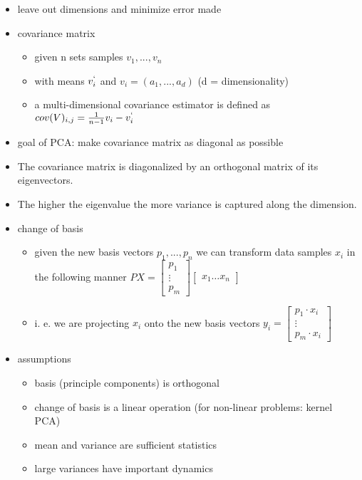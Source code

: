 \documentclass[paper=a4, fontsize=11pt]{scrartcl} %
\numberwithin{equation}{section} %
\numberwithin{figure}{section} %
\numberwithin{table}{section} %
\begin{document}
\begin{itemize}
\item leave out dimensions and minimize error made
\item covariance matrix
\begin{itemize}
\item given n sets samples $v_1,...,v_n$
\item with means $v_i^{`}$ and $v_i = (a_1,...,a_d)$ (d = dimensionality)
\item a multi-dimensional covariance estimator is defined as $cov(V)_{i,j} = \frac{1}{n-1}{v_i - v_i^{`}}$
\end{itemize}
\item goal of PCA: make covariance matrix as diagonal as possible
\item The covariance matrix is diagonalized by an orthogonal matrix of its eigenvectors.
\item The higher the eigenvalue the more variance is captured along the dimension.
\item change of basis
\begin{itemize}
\item given the new basis vectors $p_1,...,p_n$ we can transform data samples $x_i$ in the following manner $PX = \begin{bmatrix}
           p_{1} \\
           \vdots \\
           p_{m}
         \end{bmatrix} \begin{bmatrix}
         	x_1 \hdots x_n
         \end{bmatrix}$
\item i. e. we are projecting $x_i$ onto the new basis vectors $y_i = \begin{bmatrix}
           p_1 \cdot x_i \\
           \vdots \\
           p_m \cdot x_i
         \end{bmatrix}$
\end{itemize}
\item assumptions
\begin{itemize}
\item basis (principle components) is orthogonal
\item change of basis is a linear operation (for non-linear problems: kernel PCA)
\item mean and variance are sufficient statistics 
\item large variances have important dynamics
\end{itemize}
\end{itemize}
\end{document}
